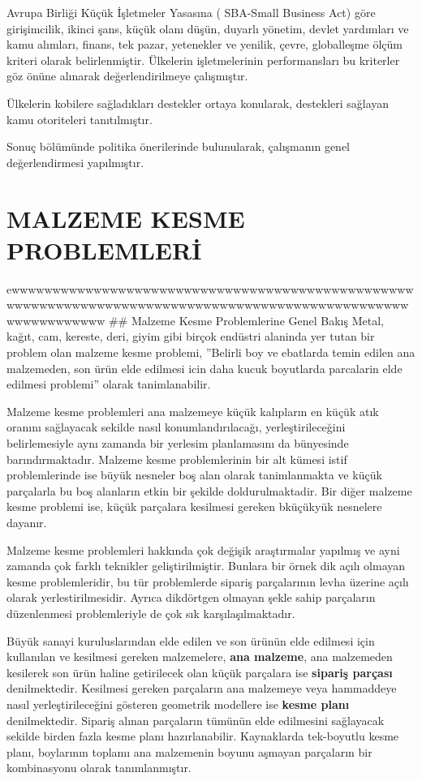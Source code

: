 \documentclass[]{book}
\begin{document}
Avrupa Birliği Küçük İşletmeler Yasasına ( SBA-Small Business Act) göre girişimcilik, ikinci şans, küçük olanı düşün, duyarlı yönetim, devlet yardımları ve kamu alımları, finans, tek pazar, yetenekler ve yenilik, çevre, globalleşme ölçüm kriteri olarak belirlenmiştir. Ülkelerin işletmelerinin performansları bu kriterler göz önüne alınarak değerlendirilmeye çalışmıştır.

Ülkelerin kobilere sağladıkları destekler ortaya konularak, destekleri sağlayan kamu otoriteleri tanıtılmıştır.

Sonuç bölümünde politika önerilerinde bulunularak, çalışmanın genel değerlendirmesi yapılmıştır.

\hypertarget{malzeme-kesme-problemleri}{%
\chapter{MALZEME KESME PROBLEMLERİ}\label{malzeme-kesme-problemleri}}

ewwwwwwwwwwwwwwwwwwwwwwwwwwwwwwwwwwwwwwwwwwwwwwwwwwwwwwwwwwwwwwwwwwwwwwwwwwwwwwwwwwwwwwwwwwwwwwwwwwwwwwwwwwwwww
\#\# Malzeme Kesme Problemlerine Genel Bakış
Metal, kağıt, cam, kereste, deri, giyim gibi birçok endüstri alaninda yer tutan bir problem olan malzeme kesme problemi, ''Belirli boy ve ebatlarda temin edilen ana malzemeden, son ürün elde edilmesi icin daha kucuk boyutlarda parcalarin elde edilmesi problemi'' olarak tanimlanabilir.

Malzeme kesme problemleri ana malzemeye küçük kalıpların en küçük atık oranını sağlayacak sekilde nasıl konumlandırılacağı, yerleştirileceğini belirlemesiyle aynı zamanda bir yerlesim planlamasını da bünyesinde barındırmaktadır. Malzeme kesme problemlerinin bir alt kümesi istif problemlerinde ise büyük nesneler boş alan olarak tanimlanmakta ve küçük parçalarla bu boş alanların etkin bir şekilde doldurulmaktadir. Bir diğer malzeme kesme problemi ise, küçük parçalara kesilmesi gereken bküçükyük nesnelere dayanır.

Malzeme kesme problemleri hakkında çok değişik araştırmalar yapılmış ve ayni zamanda çok farklı teknikler geliştirilmiştir. Bunlara bir örnek dik açılı olmayan kesme problemleridir, bu tür problemlerde sipariş parçalarının levha üzerine açılı olarak yerlestirilmesidir. Ayrıca dikdörtgen olmayan şekle sahip parçaların düzenlenmesi problemleriyle de çok sık karşılaşılmaktadır.

Büyük sanayi kuruluslarından elde edilen ve son ürünün elde edilmesi için kullanılan ve kesilmesi gereken malzemelere, \textbf{ana malzeme}, ana malzemeden kesilerek son ürün haline getirilecek olan küçük parçalara ise \textbf{sipariş parçası} denilmektedir. Kesilmesi gereken parçaların ana malzemeye veya hammaddeye nasıl yerleştirileceğini gösteren geometrik modellere ise \textbf{kesme planı} denilmektedir. Sipariş alınan parçaların tümünün elde edilmesini sağlayacak sekilde birden fazla kesme planı hazırlanabilir. Kaynaklarda tek-boyutlu kesme planı, boylarının toplamı ana malzemenin boyunu aşmayan parçaların bir kombinasyonu olarak tanımlanmıştır.
\end{document}
